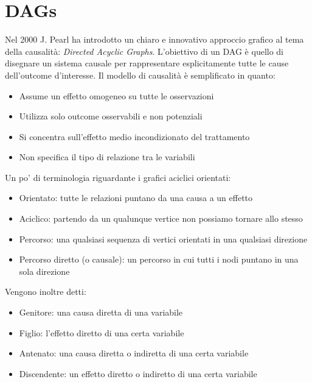 \chapter{DAGs}
Nel 2000 J. Pearl ha introdotto un chiaro e innovativo approccio grafico al tema della 
causalità: \textit{Directed Acyclic Graphs}.
L’obiettivo di un DAG è quello di disegnare un sistema causale per rappresentare 
esplicitamente tutte le cause dell’outcome d'interesse.
Il modello di causalità è semplificato in quanto: 
\begin{itemize}
    \item Assume un effetto omogeneo su tutte le osservazioni
    \item Utilizza solo outcome osservabili e non potenziali
    \item Si concentra sull'effetto medio incondizionato del trattamento
    \item Non specifica il tipo di relazione tra le variabili
\end{itemize}
Un po' di terminologia riguardante i grafici aciclici orientati: 
\begin{itemize}
    \item Orientato: tutte le relazioni puntano da una causa a un effetto
    \item Aciclico: partendo da un qualunque vertice non possiamo tornare allo stesso
    \item Percorso: una qualsiasi sequenza di vertici orientati in una qualsiasi direzione
    \item Percorso diretto (o causale): un percorso in cui tutti i nodi puntano in una sola 
        direzione
\end{itemize}
Vengono inoltre detti: 
\begin{itemize}
    \item Genitore: una causa diretta di una variabile
    \item Figlio: l'effetto diretto di una certa variabile
    \item Antenato: una causa diretta o indiretta di una certa variabile
    \item Discendente: un effetto diretto o indiretto di una certa variabile
\end{itemize}
